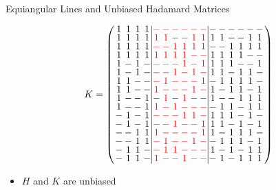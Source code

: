 \documentclass{beamer}
\newcommand{\rred}[1]{\textcolor{red}{#1}}
\begin{document}
\begin{frame}{Equiangular Lines and Unbiased Hadamard Matrices}

  \[
    K=
    \arraycolsep=1.0pt\def\arraystretch{0.75}
    \left(
      \begin{array}{cccc|cccccc|cccccc}
        1&1&1&1&\rred{-}&\rred{-}&\rred{-}&\rred{-}&\rred{-}&\rred{-}&-&-&-&-&-&-\\
        1&1&1&1&\rred{1}&\rred{1}&\rred{-}&\rred{-}&\rred{1}&\rred{1}&1&1&-&-&1&1\\
        1&1&1&1&\rred{-}&\rred{-}&\rred{1}&\rred{1}&\rred{1}&\rred{1}&-&-&1&1&1&1\\
        1&1&1&1&\rred{1}&\rred{1}&\rred{1}&\rred{1}&\rred{-}&\rred{-}&1&1&1&1&-&-\\
        1&-&1&-&\rred{-}&\rred{-}&\rred{-}&\rred{1}&\rred{-}&\rred{1}&1&1&1&-&-&1\\
        1&-&1&-&\rred{-}&\rred{-}&\rred{1}&\rred{-}&\rred{1}&\rred{-}&1&1&-&1&1&-\\
        1&1&-&-&\rred{-}&\rred{1}&\rred{-}&\rred{-}&\rred{-}&\rred{1}&-&1&1&1&1&-\\
        1&1&-&-&\rred{1}&\rred{-}&\rred{-}&\rred{-}&\rred{1}&\rred{-}&1&-&1&1&-&1\\
        1&-&-&1&\rred{-}&\rred{1}&\rred{-}&\rred{1}&\rred{-}&\rred{-}&1&-&-&1&1&1\\
        1&-&-&1&\rred{1}&\rred{-}&\rred{1}&\rred{-}&\rred{-}&\rred{-}&-&1&1&-&1&1\\
        -&1&-&1&\rred{-}&\rred{-}&\rred{-}&\rred{1}&\rred{1}&\rred{-}&1&1&1&-&1&-\\
        -&1&-&1&\rred{-}&\rred{-}&\rred{1}&\rred{-}&\rred{-}&\rred{1}&1&1&-&1&-&1\\
        -&-&1&1&\rred{1}&\rred{-}&\rred{-}&\rred{-}&\rred{-}&\rred{1}&1&-&1&1&1&-\\
        -&-&1&1&\rred{-}&\rred{1}&\rred{-}&\rred{-}&\rred{1}&\rred{-}&-&1&1&1&-&1\\
        -&1&1&-&\rred{-}&\rred{1}&\rred{1}&\rred{-}&\rred{-}&\rred{-}&1&-&1&-&1&1\\
        -&1&1&-&\rred{1}&\rred{-}&\rred{-}&\rred{1}&\rred{-}&\rred{-}&-&1&-&1&1&1\\
      \end{array}
    \right)
  \]

  \begin{itemize}
    \item $H$ and $K$ are unbiased
  \end{itemize}
  
\end{frame}
\end{document}
